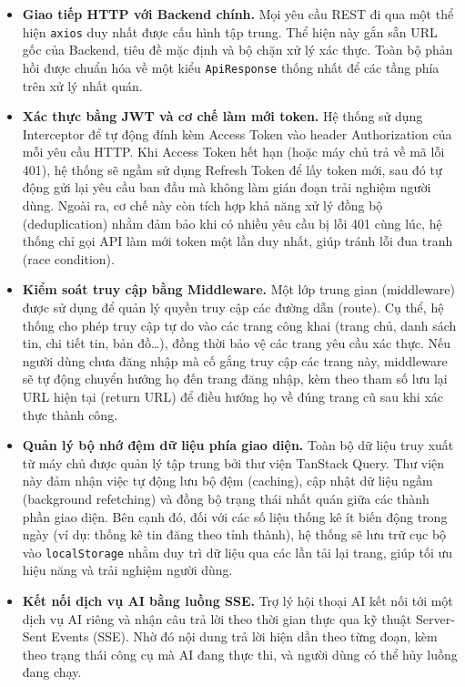 \begin{itemize}
\item \textbf{Giao tiếp HTTP với Backend chính.} Mọi yêu cầu REST đi qua một thể hiện \texttt{axios} duy nhất được cấu hình tập trung. Thể hiện này gắn sẵn URL gốc của Backend, tiêu đề mặc định và bộ chặn xử lý xác thực. Toàn bộ phản hồi được chuẩn hóa về một kiểu \texttt{ApiResponse} thống nhất để các tầng phía trên xử lý nhất quán.

\item \textbf{Xác thực bằng JWT và cơ chế làm mới token.} Hệ thống sử dụng Interceptor để tự động đính kèm Access Token vào header Authorization của mỗi yêu cầu HTTP. Khi Access Token hết hạn (hoặc máy chủ trả về mã lỗi 401), hệ thống sẽ ngầm sử dụng Refresh Token để lấy token mới, sau đó tự động gửi lại yêu cầu ban đầu mà không làm gián đoạn trải nghiệm người dùng. Ngoài ra, cơ chế này còn tích hợp khả năng xử lý đồng bộ (deduplication) nhằm đảm bảo khi có nhiều yêu cầu bị lỗi 401 cùng lúc, hệ thống chỉ gọi API làm mới token một lần duy nhất, giúp tránh lỗi đua tranh (race condition).

\item \textbf{Kiểm soát truy cập bằng Middleware.} Một lớp trung gian (middleware) được sử dụng để quản lý quyền truy cập các đường dẫn (route). Cụ thể, hệ thống cho phép truy cập tự do vào các trang công khai (trang chủ, danh sách tin, chi tiết tin, bản đồ\ldots), đồng thời bảo vệ các trang yêu cầu xác thực. Nếu người dùng chưa đăng nhập mà cố gắng truy cập các trang này, middleware sẽ tự động chuyển hướng họ đến trang đăng nhập, kèm theo tham số lưu lại URL hiện tại (return URL) để điều hướng họ về đúng trang cũ sau khi xác thực thành công.

\item \textbf{Quản lý bộ nhớ đệm dữ liệu phía giao diện.} Toàn bộ dữ liệu truy xuất từ máy chủ được quản lý tập trung bởi thư viện TanStack Query. Thư viện này đảm nhận việc tự động lưu bộ đệm (caching), cập nhật dữ liệu ngầm (background refetching) và đồng bộ trạng thái nhất quán giữa các thành phần giao diện. Bên cạnh đó, đối với các số liệu thống kê ít biến động trong ngày (ví dụ: thống kê tin đăng theo tỉnh thành), hệ thống sẽ lưu trữ cục bộ vào \texttt{localStorage} nhằm duy trì dữ liệu qua các lần tải lại trang, giúp tối ưu hiệu năng và trải nghiệm người dùng.

\item \textbf{Kết nối dịch vụ AI bằng luồng SSE.} Trợ lý hội thoại AI kết nối tới một dịch vụ AI riêng và nhận câu trả lời theo thời gian thực qua kỹ thuật Server-Sent Events (SSE). Nhờ đó nội dung trả lời hiện dần theo từng đoạn, kèm theo trạng thái công cụ mà AI đang thực thi, và người dùng có thể hủy luồng đang chạy.


\end{itemize}

